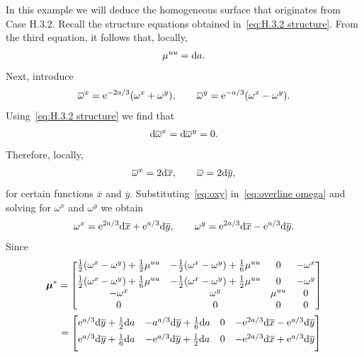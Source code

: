 \documentclass[10pt,a4paper]{amsart}
\numberwithin{equation}{section}
\newcommand{\bmu}{\boldsymbol{\mu}}
\newcommand{\ox}{\overline{x}}
\newcommand{\oy}{\overline{y}}
\begin{document}
\begin{Example}
In this example we will deduce the homogeneous surface that originates from Case H.3.2. Recall the structure equations obtained in~\eqref{eq:H.3.2 structure}. From the third equation, it follows that, locally,
\begin{gather*}
\mu^{uu} ={\rm d}a.
\end{gather*}
Next, introduce
%
\begin{gather}\label{eq:overline omega}
\overline{\omega}^x = {\rm e}^{-2a/3}(\omega^x+\omega^y),\qquad
\overline{\omega}^y = {\rm e}^{-a/3}(\omega^x-\omega^y).
\end{gather}
%
Using~\eqref{eq:H.3.2 structure} we find that
%
\begin{gather*}
{\rm d}\overline{\omega}^x = {\rm d}\overline{\omega}^y = 0.
\end{gather*}
%
Therefore, locally,
%
\begin{gather}\label{eq:oxy}
\overline{\omega}^x = 2 {\rm d}\ox,\qquad
\overline{\omega}=2 {\rm d}\oy,
\end{gather}
for certain functions $\ox$ and $\oy$. Substituting~\eqref{eq:oxy} in~\eqref{eq:overline omega} and solving for $\omega^x$ and $\omega^y$ we obtain
\begin{gather*}
\omega^x = {\rm e}^{2a/3}{\rm d}\ox + {\rm e}^{a/3}{\rm d}\oy,\qquad
\omega^y = {\rm e}^{2a/3}{\rm d}\ox - {\rm e}^{a/3}{\rm d}\oy.
\end{gather*}
Since
%
\begin{gather}
\bmu^*=
\begin{bmatrix}
\frac{1}{2}(\omega^x-\omega^y)+\frac{1}{2}\mu^{uu} & -\frac{1}{2}(\omega^x-\omega^y)+\frac{1}{6}\mu^{uu} & 0 & -\omega^x \\[1ex]
%
\frac{1}{2}(\omega^x-\omega^y) +\frac{1}{6}\mu^{uu} & -\frac{1}{2}(\omega^x-\omega^y)+\frac{1}{2}\mu^{uu} & 0 & -\omega^y \\
%
-\omega^x & \omega^y &\mu^{uu} & 0 \\
%
0 & 0 & 0 & 0
\end{bmatrix} \nonumber
\\ \hphantom{\bmu^*}
=\begin{bmatrix}
{\rm e}^{a/3}{\rm d}\oy + \frac{1}{2}{\rm d}a & -a^{a/3}{\rm d}\oy + \frac{1}{6}{\rm d}a & 0 & -{\rm e}^{2a/3}{\rm d}\ox - {\rm e}^{a/3}{\rm d}\oy \\[1ex]
%
{\rm e}^{a/3}{\rm d}\oy + \frac{1}{6}{\rm d}a & -{\rm e}^{a/3}{\rm d}\oy + \frac{1}{2}{\rm d}a & 0 & -{\rm e}^{2a/3}{\rm d}\ox + {\rm e}^{a/3}{\rm d}\oy \\[1ex]

\end{bmatrix}
\end{gather}
\end{Example}
\end{document}

